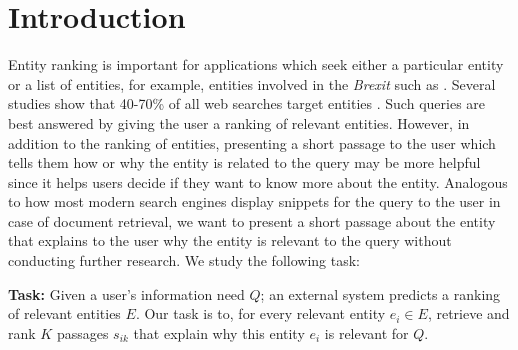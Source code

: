 \documentclass[sigconf]{acmart}
\begin{document}


%


%
\maketitle

\section{Introduction}
\label{sec:Introduction}

Entity ranking is important for applications which seek either a particular entity or a list of entities, for example, entities involved in the \textit{Brexit} such as .  Several studies show that 40-70\% of all web searches target entities \cite{guo2009named,balog2018entity}. Such queries are best answered by giving the user a ranking of relevant entities. However, in addition to the ranking of entities, presenting a short passage to the user which tells them how or why the entity is related to the query may be more helpful since it helps users decide if they want to know more about the entity. Analogous to how most modern search engines display snippets for the query to the user in case of document retrieval, we want to present a short passage about the entity that explains to the user why the entity is relevant to the query without conducting further research. We study the following task:

\textbf{Task:} Given a user's information need $Q$; an external system predicts a ranking of relevant entities $E$. Our task is to, for every relevant entity $e_i \in E$, retrieve and rank $K$ passages $s_{ik}$ that explain why this entity $e_i$ is relevant for $Q$. 
\end{document}
